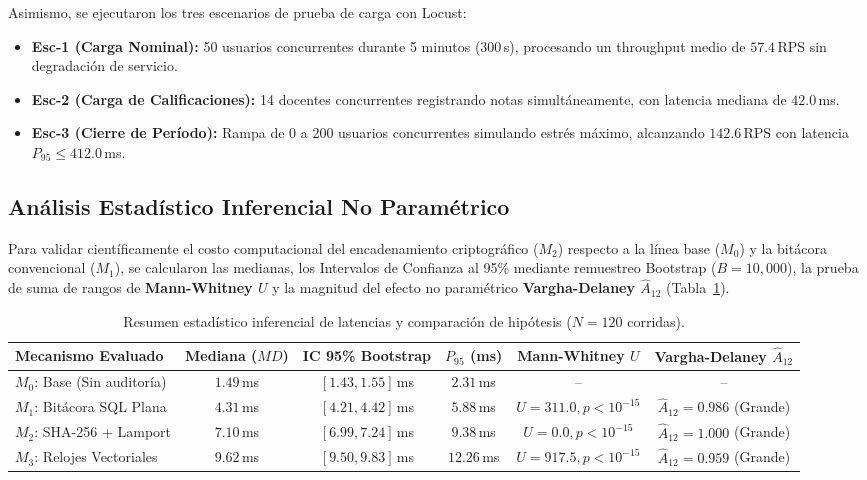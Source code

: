 \documentclass[11pt,a4paper]{article}
\begin{document}
Asimismo, se ejecutaron los tres escenarios de prueba de carga con Locust:
\begin{itemize}[noitemsep]
  \item \textbf{Esc-1 (Carga Nominal):} 50 usuarios concurrentes durante 5 minutos (300\,s), procesando un throughput medio de $57.4$\,RPS sin degradaci\'on de servicio.
  \item \textbf{Esc-2 (Carga de Calificaciones):} 14 docentes concurrentes registrando notas simult\'aneamente, con latencia mediana de $42.0$\,ms.
  \item \textbf{Esc-3 (Cierre de Per\'iodo):} Rampa de 0 a 200 usuarios concurrentes simulando estr\'es m\'aximo, alcanzando $142.6$\,RPS con latencia $P_{95} \le 412.0$\,ms.
\end{itemize}

\subsection{An\'alisis Estad\'istico Inferencial No Param\'etrico}
Para validar cient\'ificamente el costo computacional del encadenamiento criptogr\'afico ($M_2$) respecto a la l\'inea base ($M_0$) y la bit\'acora convencional ($M_1$), se calcularon las medianas, los Intervalos de Confianza al 95\% mediante remuestreo Bootstrap ($B = 10{,}000$), la prueba de suma de rangos de \textbf{Mann-Whitney $U$} y la magnitud del efecto no param\'etrico \textbf{Vargha-Delaney $\hat{A}_{12}$} (Tabla~\ref{tab:estadisticas-latencia}).

\begin{table}[H]
\centering
\small
\caption{Resumen estad\'istico inferencial de latencias y comparaci\'on de hip\'otesis ($N = 120$ corridas).}
\label{tab:estadisticas-latencia}
\begin{tabularx}{\textwidth}{l c c c c c}
\toprule
\textbf{Mecanismo Evaluado} & \textbf{Mediana ($MD$)} & \textbf{IC 95\% Bootstrap} & \textbf{$P_{95}$ (ms)} & \textbf{Mann-Whitney $U$} & \textbf{Vargha-Delaney $\hat{A}_{12}$} \\
\midrule
$M_0$: Base (Sin auditor\'ia) & $1.49$\,ms & $[1.43, 1.55]$\,ms & $2.31$\,ms & -- & -- \\
$M_1$: Bit\'acora SQL Plana   & $4.31$\,ms & $[4.21, 4.42]$\,ms & $5.88$\,ms & $U = 311.0, p < 10^{-15}$ & $\hat{A}_{12} = 0.986$ (Grande) \\
$M_2$: SHA-256 + Lamport      & $7.10$\,ms & $[6.99, 7.24]$\,ms & $9.38$\,ms & $U = 0.0, p < 10^{-15}$   & $\hat{A}_{12} = 1.000$ (Grande) \\
$M_3$: Relojes Vectoriales   & $9.62$\,ms & $[9.50, 9.83]$\,ms & $12.26$\,ms& $U = 917.5, p < 10^{-15}$ & $\hat{A}_{12} = 0.959$ (Grande) \\
\bottomrule
\end{tabularx}
\end{table}
\end{document}
